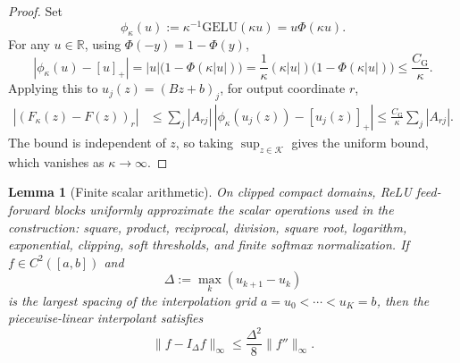 \documentclass[11pt]{article}
\newtheorem{lemma}{Lemma}
\begin{document}
\begin{proof}
Set
\[
\phi_\kappa(u):=\kappa^{-1}\mathrm{GELU}(\kappa u)
=u\Phi(\kappa u).
\]
For any \(u\in\mathbb R\), using \(\Phi(-y)=1-\Phi(y)\),
\[
|\phi_\kappa(u)-[u]_+|
=
|u|\bigl(1-\Phi(\kappa |u|)\bigr)
=
\frac{1}{\kappa}(\kappa |u|)
\bigl(1-\Phi(\kappa |u|)\bigr)
\le
\frac{C_{\mathrm G}}{\kappa}.
\]
Applying this to \(u_j(z)=(Bz+b)_j\), for output coordinate \(r\),
\[
\begin{aligned}
|(F_\kappa(z)-F(z))_r|
&\le
\sum_j |A_{rj}|\,
|\phi_\kappa(u_j(z))-[u_j(z)]_+| \le
\frac{C_{\mathrm G}}{\kappa}\sum_j |A_{rj}|.
\end{aligned}
\]
The bound is independent of \(z\), so taking \(\sup_{z\in\mathcal K}\) gives
the uniform bound, which vanishes as \(\kappa\to\infty\).
\end{proof}

\begin{lemma}[Finite scalar arithmetic]
\label{lem:scalar-arithmetic}
On clipped compact domains, ReLU feed-forward blocks uniformly approximate the
scalar operations used in the construction: square, product, reciprocal,
division, square root, logarithm, exponential, clipping, soft thresholds, and
finite softmax normalization. If \(f\in C^2([a,b])\) and
\[
\Delta:=\max_k (u_{k+1}-u_k)
\]
is the largest spacing of the interpolation grid
\(a=u_0<\cdots<u_K=b\), then the piecewise-linear interpolant satisfies
\[
\|f-I_\Delta f\|_\infty
\le
\frac{\Delta^2}{8}\|f''\|_\infty .
\]
\end{lemma}
\end{document}
